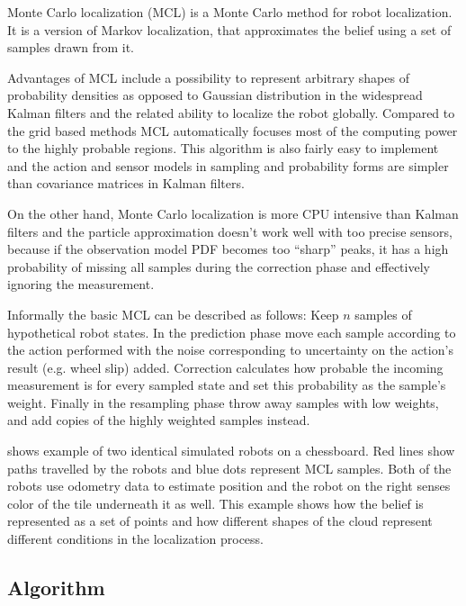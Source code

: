 Monte Carlo localization (MCL) \cite{dellaert99} is a Monte Carlo method for
robot localization.
It is a version of Markov localization, that approximates the belief
using a set of samples drawn from it.

Advantages of MCL include a
possibility to represent arbitrary shapes of probability densities as opposed to
Gaussian distribution in the widespread Kalman filters
and the related ability to localize the robot globally.
Compared to the grid based methods MCL automatically focuses most of the
computing power to the highly probable regions.
This algorithm is also fairly easy to implement and the action and sensor models
in sampling and probability forms are simpler than covariance matrices in
Kalman filters.

On the other hand, Monte Carlo localization is more CPU intensive than Kalman filters
and the particle approximation doesn't work well with too precise sensors,
because if the observation model PDF becomes too \enquote{sharp} peaks, it has a high probability
of missing all samples during the correction phase and effectively ignoring the measurement.

Informally the basic MCL can be described as follows:
Keep \(n\) samples of hypothetical robot states.
In the prediction phase move each sample according to the action performed with the noise corresponding
to uncertainty on the action's result (e.g. wheel slip) added.
Correction calculates how probable the incoming measurement is
for every sampled state and set this probability as the sample's weight.
Finally in the resampling phase throw away samples with low weights, and add
copies of the highly weighted samples instead.

 shows example of two identical simulated robots on a chessboard.
Red lines show paths travelled by the robots and blue dots represent MCL samples.
Both of the robots use odometry data to estimate position and the robot on the right
senses color of the tile underneath it as well.
This example shows how the belief is represented as a set of points and how
different shapes of the cloud represent different conditions in the localization
process.

\subsection{Algorithm}

